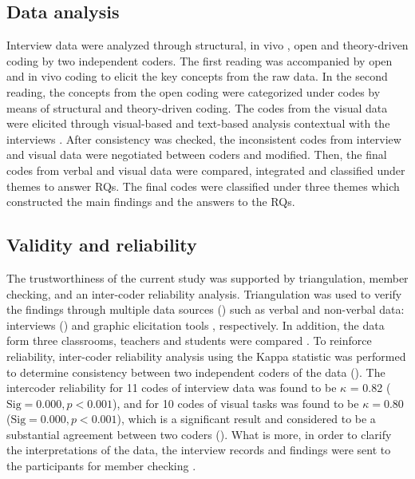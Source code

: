 \documentclass[output=paper]{../langscibook}
\begin{document}
\subsection{Data analysis}



Interview data were analyzed through structural, in vivo \citep{Saldaña2013}, open and theory-driven coding \citep{DeCuirGunbyEtAl2011} by two independent coders.  The first reading was accompanied by open and in vivo coding to elicit the key concepts from the raw data. In the second reading, the concepts from the open coding were categorized under codes by means of structural and theory-driven coding. The codes from the visual data were elicited through visual-based and text-based analysis contextual with the interviews \citep{Bagnoli2009}. After consistency was checked, the inconsistent codes from interview and visual data were negotiated between coders and modified. Then, the final codes from verbal and visual data were compared, integrated and classified under themes to answer RQs. The final codes were classified under three themes which constructed the main findings and the answers to the RQs.



\subsection{Validity and reliability}



The trustworthiness of the current study was supported by triangulation, member checking, and an inter-coder reliability analysis. Triangulation was used to verify the findings through multiple data sources (\citealt{MilesEtAl2014}) such as verbal and non-verbal data: interviews (\citealt{FraenkleWallen2009}) and graphic elicitation tools \citep{Bagnoli2009}, respectively. In addition, the data form three classrooms, teachers and students were compared \citep{MilesEtAl2014}. To reinforce reliability, inter-coder reliability analysis using the Kappa statistic was performed to determine consistency between two independent coders of the data (\citealt{LandisKoch1977}). The intercoder reliability for 11 codes of interview data was found to be $\kappa$ = 0.82 ($\text{Sig} = 0.000, p < 0.001$), and for 10 codes of visual tasks was found to be $\kappa = 0.80$ ($\text{Sig}= 0.000, p < 0.001$), which is a significant result and considered to be a substantial agreement between two coders (\citealt{VieraGarrett2005}). What is more, in order to clarify the interpretations of the data, the interview records and findings were sent to the participants for member checking \citep{Sandelowski1993}.
\end{document}
